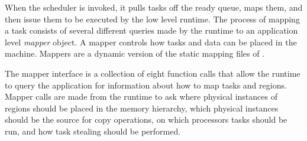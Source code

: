 
When the scheduler is invoked, it pulls tasks off the ready queue, maps them,
and then issue them to be executed by the low level runtime.  The process of mapping a task
consists of several different queries made by the runtime to an application level {\em mapper} object.
A mapper controls how tasks and data can be placed in the machine.  Mappers are a dynamic version of 
the static mapping files of \cite{Fatahalian06}.  

The mapper interface is a collection of eight function calls that allow the runtime to query
the application for information about how to map tasks and regions.  Mapper calls are made
from the runtime to ask where physical instances of regions should be placed in the memory hierarchy,
which physical instances should be the source for copy operations, on which processors
tasks should be run, and how task stealing should be performed.




